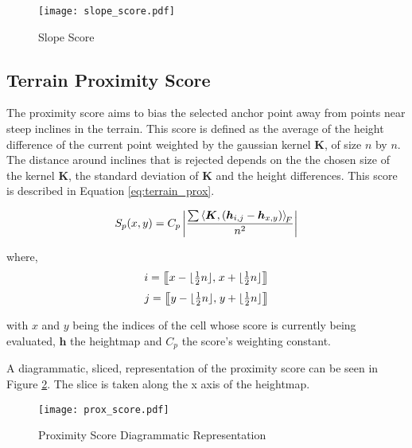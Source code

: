         \begin{figure}[h]
            \centering
            \texttt{[image: slope\_score.pdf]}
            \caption{Slope Score}
            \label{fig:slope_score}
        \end{figure}

    \subsection{Terrain Proximity Score}
    The proximity score aims to bias the selected anchor point away from points near steep inclines in the terrain. This score is defined as the average of the height
    difference of the current point weighted by the gaussian kernel \(\boldsymbol{K}\), of size \(n\) by \(n\). The distance around inclines that is rejected depends on the the
    chosen size of the kernel \(\boldsymbol{K}\), the standard deviation of \(\boldsymbol{K}\) and the height differences. This score is described in Equation
    \ref{eq:terrain_prox}.

    \begin{equation} \label{eq:terrain_prox}
        S_p(x,y) = C_p\left|\frac{\sum\left\langle\boldsymbol{K},(\boldsymbol{h}_{i,j}-\boldsymbol{h}_{x,y})\right\rangle _{\mkern-3mu F}}{n^2}\right|
    \end{equation}

    \noindent
    where,
    \[i = \big[\mkern-4.7mu\big[x- \lfloor\tfrac{1}{2}n\rfloor,\mkern2mu x+\lfloor\tfrac{1}{2}n\rfloor\big]\mkern-4.7mu\big]\]
    \[j = \big[\mkern-4.7mu\big[y-\lfloor\tfrac{1}{2}n\rfloor,\mkern2mu y+ \lfloor\tfrac{1}{2}n\rfloor\big]\mkern-4.7mu\big]\]
    
    
    \noindent
    with \(x\) and \(y\) being the indices of the cell whose score is currently being evaluated, \(\boldsymbol{h}\) the
    heightmap and \(C_p\) the score's weighting constant.
    
    A diagrammatic, sliced, representation of the proximity score can be seen in Figure \ref{fig:prox_score_diagram}. The
    slice is taken along the x axis of the heightmap.

    \begin{figure}[h]
        \centering
        \texttt{[image: prox\_score.pdf]}
        \caption{Proximity Score Diagrammatic Representation}
        \label{fig:prox_score_diagram}
    \end{figure}

